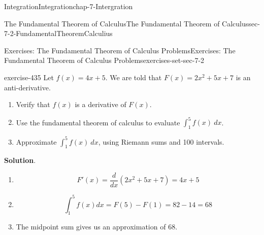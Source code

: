 \documentclass[oneside,10pt,]{book}
\numberwithin{equation}{section}
\begin{document}
\begin{chapterptx}{Integration}{}{Integration}{}{}{chap-7-Intergration}
\begin{sectionptx}{The Fundamental Theorem of Calculus}{}{The Fundamental Theorem of Calculus}{}{}{sec-7-2-FundamentalTheoremCalculius}
%
%
\typeout{************************************************}
\typeout{************************************************}
%
\begin{exercises-subsection-numberless}{Exercises: The Fundamental Theorem of Calculus Problems}{}{Exercises: The Fundamental Theorem of Calculus Problems}{}{}{exercises-set-sec-7-2}
\begin{divisionexercise}{1}{}{}{exercise-435}%
\hypertarget{p-2658}{}%
Let \(f(x) = 4 x + 5\).  We are told that \(F(x) = 2 x^2 + 5 x + 7\) is an anti-derivative.%
\leavevmode%
\begin{enumerate}[label=(\alph*)]
\item\hypertarget{li-710}{}\hypertarget{p-2659}{}%
Verify that \(f(x)\) is a derivative of \(F(x)\).%
\item\hypertarget{li-711}{}\hypertarget{p-2660}{}%
Use the fundamental theorem of calculus to evaluate \(\int_1^5 f(x)\ dx\).%
\item\hypertarget{li-712}{}\hypertarget{p-2661}{}%
Approximate \(\int_1^5 f(x)\ dx\), using Riemann sums and 100 intervals.%
\end{enumerate}
\par\smallskip%
\noindent\textbf{Solution}.\hypertarget{solution-220}{}\quad%
\leavevmode%
\begin{enumerate}[label=(\alph*)]
\item\hypertarget{li-713}{}%
\begin{equation*}
F' (x)=\frac{d}{dx}  (2 x^2+ 5 x + 7)=4x+5     
\end{equation*}
%
\item\hypertarget{li-714}{}%
\begin{equation*}
\int_1^5 f(x) dx=F(5)-F(1)= 82-14=68
\end{equation*}
%
\item\hypertarget{li-715}{}\hypertarget{p-2662}{}%
The midpoint sum gives us an approximation of 68.%
\begin{sidebyside}{1}{0.25}{0.25}{0}%
\begin{sbspanel}{0.5}%

\end{sbspanel}
\end{sidebyside}
\end{enumerate}
\end{divisionexercise}
\end{exercises-subsection-numberless}
\end{sectionptx}
\end{chapterptx}
\end{document}
